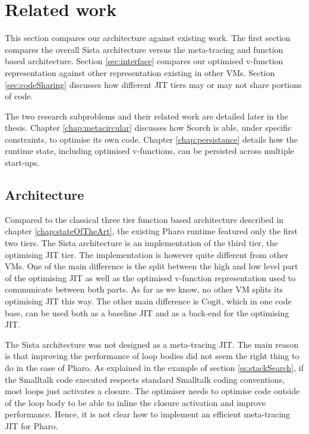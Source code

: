 \documentclass[a4paper,12pt,twoside]{../includes/ThesisStyle}
\begin{document}

\section{Related work}
\label{sec:relatedWorkArch}

This section compares our architecture against existing work. The first section compares the overall Sista architecture versus the meta-tracing and function based architecture. Section \ref{sec:interface} compares our optimised v-function representation against other representation existing in other VMs. Section \ref{sec:codeSharing} discusses how different JIT tiers may or may not share portions of code.

The two research subproblems and their related work are detailed later in the thesis. Chapter \ref{chap:metacircular} discusses how Scorch is able, under specific constraints, to optimise its own code. Chapter \ref{chap:persistance} details how the runtime state, including optimised v-functions, can be persisted across multiple start-ups.

\subsection{Architecture}

Compared to the classical three tier function based architecture described in chapter \ref{chap:stateOfTheArt}, the existing Pharo runtime featured only the first two tiers. The Sista architecture is an implementation of the third tier, the optimising JIT tier. The implementation is however quite different from other VMs. One of the main difference is the split between the high and low level part of the optimising JIT as well as the optimised v-function representation used to communicate between both parts. As far as we know, no other VM splits its optimising JIT this way. The other main difference is Cogit, which in one code base, can be used both as a baseline JIT and as a back-end for the optimising JIT.

The Sista architecture was not designed as a meta-tracing JIT. The main reason is that improving the performance of loop bodies did not seem the right thing to do in the case of Pharo. As explained in the example of section \ref{ss:stackSearch}, if the Smalltalk code executed respects standard Smalltalk coding conventions, most loops just activates a closure. The optimiser needs to optimise code outside of the loop body to be able to inline the closure activation and improve performance. Hence, it is not clear how to implement an efficient meta-tracing JIT for Pharo.
\end{document}

